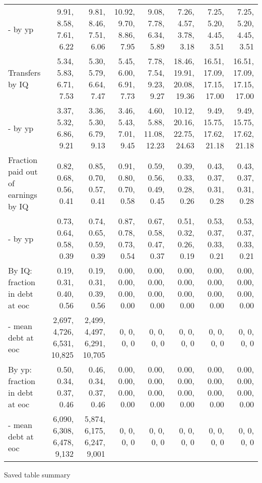 \begin{tabular}{lrrrrrrr}
- by yp & 9.91, 8.58, 7.61, 6.22  & 9.81, 8.46, 7.51, 6.06  & 10.92, 9.70, 8.86, 7.95  & 9.08, 7.78, 6.34, 5.89  & 7.26, 4.57, 3.78, 3.18  & 7.25, 5.20, 4.45, 3.51  & 7.25, 5.20, 4.45, 3.51  \\ 
Transfers by IQ & 5.34, 5.83, 6.71, 7.53  & 5.30, 5.79, 6.64, 7.47  & 5.45, 6.00, 6.91, 7.73  & 7.78, 7.54, 9.23, 9.27  & 18.46, 19.91, 20.08, 19.36  & 16.51, 17.09, 17.15, 17.00  & 16.51, 17.09, 17.15, 17.00  \\ 
- by yp & 3.37, 5.32, 6.86, 9.21  & 3.36, 5.30, 6.79, 9.13  & 3.46, 5.43, 7.01, 9.45  & 4.60, 5.88, 11.08, 12.23  & 10.12, 20.16, 22.75, 24.63  & 9.49, 15.75, 17.62, 21.18  & 9.49, 15.75, 17.62, 21.18  \\ 
Fraction paid out of earnings by IQ & 0.82, 0.68, 0.56, 0.41  & 0.85, 0.70, 0.57, 0.41  & 0.91, 0.80, 0.70, 0.58  & 0.59, 0.56, 0.49, 0.45  & 0.39, 0.33, 0.28, 0.26  & 0.43, 0.37, 0.31, 0.28  & 0.43, 0.37, 0.31, 0.28  \\ 
- by yp & 0.73, 0.64, 0.58, 0.39  & 0.74, 0.65, 0.59, 0.39  & 0.87, 0.78, 0.73, 0.54  & 0.67, 0.58, 0.47, 0.37  & 0.51, 0.32, 0.26, 0.19  & 0.53, 0.37, 0.33, 0.21  & 0.53, 0.37, 0.33, 0.21  \\ 
By IQ: fraction in debt at eoc & 0.19, 0.31, 0.40, 0.56  & 0.19, 0.31, 0.39, 0.56  & 0.00, 0.00, 0.00, 0.00  & 0.00, 0.00, 0.00, 0.00  & 0.00, 0.00, 0.00, 0.00  & 0.00, 0.00, 0.00, 0.00  & 0.00, 0.00, 0.00, 0.00  \\ 
- mean debt at eoc & 2,697, 4,726, 6,531, 10,825  & 2,499, 4,497, 6,291, 10,705  & 0, 0, 0, 0  & 0, 0, 0, 0  & 0, 0, 0, 0  & 0, 0, 0, 0  & 0, 0, 0, 0  \\ 
By yp: fraction in debt at eoc & 0.50, 0.34, 0.37, 0.46  & 0.46, 0.34, 0.37, 0.46  & 0.00, 0.00, 0.00, 0.00  & 0.00, 0.00, 0.00, 0.00  & 0.00, 0.00, 0.00, 0.00  & 0.00, 0.00, 0.00, 0.00  & 0.00, 0.00, 0.00, 0.00  \\ 
- mean debt at eoc & 6,090, 6,308, 6,478, 9,132  & 5,874, 6,175, 6,247, 9,001  & 0, 0, 0, 0  & 0, 0, 0, 0  & 0, 0, 0, 0  & 0, 0, 0, 0  & 0, 0, 0, 0  \\ 
\hline
\end{tabular}%
Saved table summary

